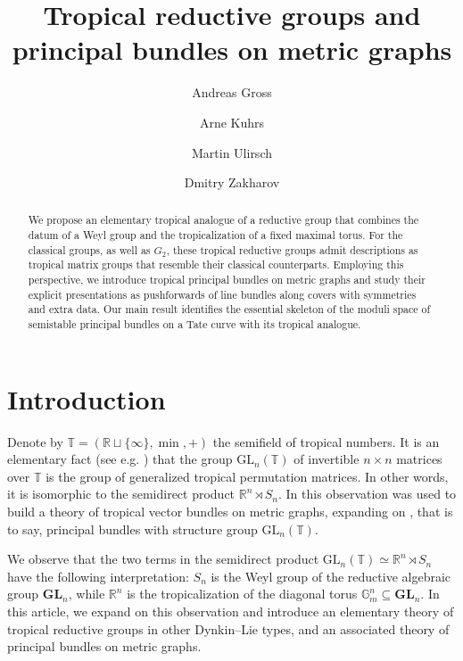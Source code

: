 \documentclass[10pt, a4paper]{amsart}
\title{Tropical reductive groups and principal bundles on metric graphs}
\date{}
\author{Andreas Gross}
\author{Arne Kuhrs}
\author{Martin Ulirsch}
\author{Dmitry Zakharov}
\theoremstyle{definition}
\theoremstyle{myitemstyle}
\newcommand{\R}{\mathbb{R}}
\newcommand{\G}{\mathbb{G}}
\newcommand{\TT}{\mathbb{T}}
\newcommand{\T}{\mathbb{T}}
\newcommand{\GL}{{\mathrm{GL}}}
\begin{document}
\begin{abstract} We propose an elementary tropical analogue of a reductive group that combines the datum of a Weyl group and the tropicalization of a fixed maximal torus. For the classical groups, as well as $G_2$, these tropical reductive groups admit descriptions as tropical matrix groups that resemble their classical counterparts. Employing this perspective, we introduce tropical principal bundles on metric graphs and study their explicit presentations as pushforwards of line bundles along covers with symmetries and extra data. Our main result identifies the essential skeleton of the moduli space of semistable principal bundles on a Tate curve with its tropical analogue.
\end{abstract}

\maketitle

\setcounter{tocdepth}{1}
\tableofcontents





\section*{Introduction}

Denote by $\mathbb{T}=(\R\sqcup\{\infty\}, \min, +)$ the semifield of tropical numbers. It is an elementary fact (see e.g. \cite[Lemma 1.4]{TropChern}) that the group $\GL_n(\mathbb{T})$ of invertible $n\times n$ matrices over $\TT$ is the group of generalized tropical permutation matrices. In other words, it is isomorphic to the semidirect product $\mathbb{R}^n\rtimes S_n$. In \cite{2022GrossUlirschZakharov} this observation was used to build a theory of tropical vector bundles on metric graphs, expanding on \cite{TropChern}, that is to say, principal bundles with structure group $\GL_n(\T)$. 

We observe that the two terms in the semidirect product $\GL_n(\mathbb{T})\simeq \mathbb{R}^n\rtimes S_n$ have the following interpretation: $S_n$ is the Weyl group of the reductive algebraic group $\mathbf{GL}_n$, while $\R^n$ is the tropicalization of the diagonal torus $\G_m^n\subseteq \mathbf{GL}_n$. In this article, we expand on this observation and introduce an elementary theory of tropical reductive groups in other Dynkin--Lie types, and an associated theory of principal bundles on metric graphs. 
\end{document}
